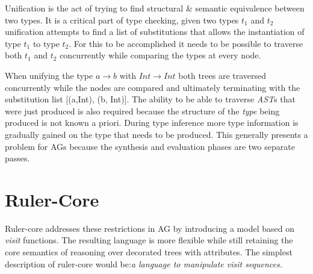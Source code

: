Unification is the act of trying to find structural \& semantic equivalence between two types. It is a critical part of type checking, given two types \emph{$t_{1}$} and \emph{$t_{2}$} unification attempts to find a list of substitutions that allows the instantiation of type \emph{$t_{1}$} to type \emph{$t_{2}$}. For this to be accomplished it needs to be possible to traverse both \emph{$t_{1}$} and \emph{$t_{2}$} concurrently while comparing the types at every node.

%
%    
%

When unifying the type \emph{$a \rightarrow b$} with \emph{$Int \rightarrow Int$} both trees are traversed concurrently while the nodes are compared and ultimately terminating with the substitution list [(a,Int), (b, Int)]. The ability to be able to traverse \emph{AST}s that were just produced is also required because the structure of the \emph{type} being produced is not known a priori. During type inference more type information is gradually gained on the type that needs to be produced. This generally presents a problem for AGs\cite{ruler-front} because the synthesis and evaluation phases are two separate passes.

\section{Ruler-Core}
Ruler-core addresses these restrictions in AG by introducing a model based on \emph{visit}\cite{visits} functions. The resulting language is more flexible while still retaining the core semantics of reasoning over decorated trees with attributes. The simplest description of ruler-core would be:\emph{a language to manipulate visit sequences.}

